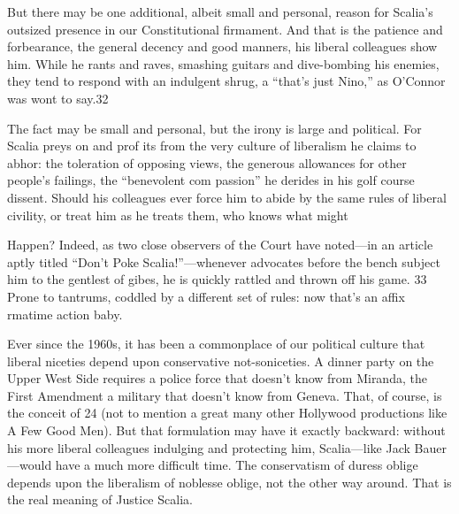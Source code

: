  \par 
But there may be one additional, albeit small and personal, reason for Scalia’s outsized presence in our Constitutional firmament. And that is the patience and forbearance, the general decency and good manners, his liberal colleagues show him. While he rants and raves, smashing guitars and dive-bombing his enemies, they tend to respond with an indulgent shrug, a “that’s just Nino,” as O’Connor was wont to say.{\color{blue}32}
 \par 
The fact may be small and personal, but the irony is large and political. For Scalia preys on and prof its from the very culture of liberalism he claims to abhor: the toleration of opposing views, the generous allowances for other people’s failings, the “benevolent com passion” he derides in his golf course dissent. Should his colleagues ever force him to abide by the same rules of liberal civility, or treat him as he treats them, who knows what might
 \par 
Happen? Indeed, as two close observers of the Court have noted—in an article aptly titled “Don’t Poke Scalia!”—whenever advocates before the bench subject him to the gentlest of gibes, he is quickly rattled and thrown off his game. {\color{blue}33} Prone to tantrums, coddled by a different set of rules: now that’s an affix rmatime action baby.
 \par 
Ever since the 1960s, it has been a commonplace of our political culture that liberal niceties depend upon conservative not-soniceties. A dinner party on the Upper West Side requires a police force that doesn’t know from Miranda, the First Amendment a military that doesn’t know from Geneva. That, of course, is the conceit of {\color{blue}24} (not to mention a great many other Hollywood productions like A Few Good Men). But that formulation may have it exactly backward: without his more liberal colleagues indulging and protecting him, Scalia—like Jack Bauer—would have a much more difficult time. The conservatism of duress oblige depends upon the liberalism of noblesse oblige, not the other way around. That is the real meaning of Justice Scalia.
